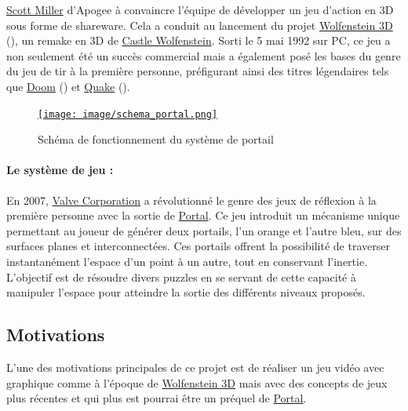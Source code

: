 \documentclass[12pt]{report}
\begin{document}
\href{https://fr.wikipedia.org/wiki/Scott_Miller_(programmeur)}{Scott Miller}\cite{Scott_Miller} d'Apogee à convaincre l'équipe de 
développer un jeu d'action en 3D sous forme de shareware. Cela a conduit au lancement du projet 
\href{https://fr.wikipedia.org/wiki/Wolfenstein_3D}{Wolfenstein 3D}\cite{Wolfenstein3D} (), un remake en 3D de 
\href{https://fr.wikipedia.org/wiki/Castle_Wolfenstein}{Castle Wolfenstein}\cite{Castle_Wolfenstein}. Sorti le 5 mai 1992 sur PC, ce jeu a 
non seulement été un succès commercial mais a également posé les bases du genre du jeu de tir à la première personne, 
préfigurant ainsi des titres légendaires tels que 
\href{https://fr.wikipedia.org/wiki/Doom_(jeu_vid%C3%A9o,_1993)}{Doom}\cite{Doom_1993} (\nameref{fig:doom_1993}) et 
\href{https://fr.wikipedia.org/wiki/Quake}{Quake}\cite{Quake} ().

\begin{figure}
	\centering
	\href{https://fr.wikipedia.org/wiki/Portal_(jeu_vid%C3%A9o)}{\texttt{[image: image/schema\_portal.png]}}
	\hspace*{-0.5cm}
	\caption{Schéma de fonctionnement du système de portail}
	\label{fig:schema_portal}
\end{figure}

\paragraph{Le système de jeu : }
En 2007, \href{https://fr.wikipedia.org/wiki/Valve_Corporation}{Valve Corporation}\cite{Valve_Corporation} a révolutionné le genre des jeux 
de réflexion à la première personne avec la sortie de 
\href{https://fr.wikipedia.org/wiki/Portal_(jeu_vid%C3%A9o)}{Portal}\cite{Portal}. Ce jeu introduit un mécanisme unique 
permettant au joueur de générer deux portails, l'un orange et l'autre bleu, sur des surfaces planes et 
interconnectées. Ces portails offrent la possibilité de traverser instantanément l'espace d'un point à un autre, 
tout en conservant l'inertie. L'objectif est de résoudre divers puzzles en se servant de cette capacité à manipuler 
l'espace pour atteindre la sortie des différents niveaux proposés.



\subsection{Motivations}


L'une des motivations principales de ce projet est de réaliser un jeu vidéo
avec graphique comme à l'époque de \href{https://fr.wikipedia.org/wiki/Wolfenstein_3D}{Wolfenstein 3D}\cite{Wolfenstein3D}
mais avec des concepts de jeux plus récentes et qui plus est pourrai être
un préquel de \href{https://fr.wikipedia.org/wiki/Portal_(jeu_vid%C3%A9o)}{Portal}\cite{Portal}.
\end{document}
